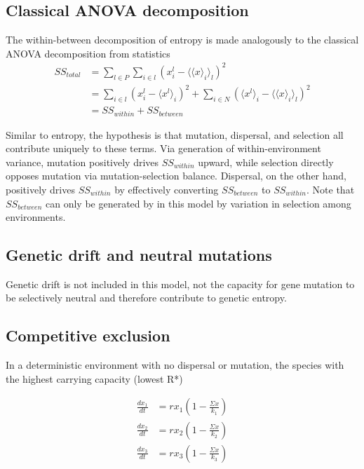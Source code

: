 \documentclass[12pt]{article}
\begin{document}
\subsection*{Classical ANOVA decomposition}
The within-between decomposition of entropy is made analogously to the classical ANOVA decomposition from statistics
\begin{align*} 
SS_{total} &= \sum_{l\in P} \sum_{i\in l}\left( x_i^l - \langle \langle x \rangle_i \rangle_l \right)^2 \\
                &= \sum_{i\in l} \left( x_i^l - \langle x^l \rangle_i \right)^2 + \sum_{i\in N} \left( \langle x^l \rangle_i - \langle \langle x \rangle_i \rangle_l \right)^2 \\
                &= SS_{within} + SS_{between}
\end{align*}

Similar to entropy, the hypothesis is that mutation, dispersal, and selection all contribute uniquely to these terms. Via generation of within-environment variance, mutation positively drives $SS_{within}$ upward, while selection directly opposes mutation via mutation-selection balance. Dispersal, on the other hand, positively drives $SS_{within}$ by effectively converting $SS_{between}$ to $SS_{within}$. Note that $SS_{between}$ can only be generated by in this model by variation in selection among environments. 

\subsection*{Genetic drift and neutral mutations}
Genetic drift is not included in this model, not the capacity for gene mutation to be selectively neutral and therefore contribute to genetic entropy. 

\subsection*{Competitive exclusion}
In a deterministic environment with no dispersal or mutation, the species with the highest carrying capacity (lowest R*)

\begin{align*}
\frac{dx_1}{dt} &= rx_1\left(1-\frac{\Sigma x}{k_1}\right)\\
\frac{dx_2}{dt} &= rx_2\left(1-\frac{\Sigma x}{k_2}\right)\\
\frac{dx_3}{dt} &= rx_3\left(1-\frac{\Sigma x}{k_3}\right)\\
\end{align*}
\end{document}
